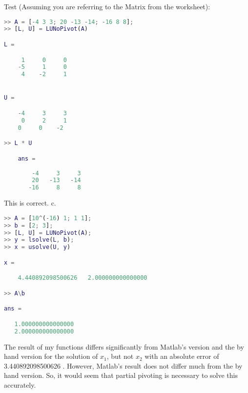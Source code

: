 \documentclass[12pt]{article}
\theoremstyle{homework}
\begin{document}
Test (Assuming you are referring to the Matrix from the worksheet):
\begin{lstlisting}[language=Matlab]
>> A = [-4 3 3; 20 -13 -14; -16 8 8];
>> [L, U] = LUNoPivot(A)

L =

	 1     0     0
	-5     1     0
	 4    -2     1


U =

	-4     3     3
	 0     2     1
    0     0    -2

>> L * U

    ans =
     
        -4     3     3
        20   -13   -14
       -16     8     8
\end{lstlisting}
This is correct. c.
\begin{lstlisting}[language=Matlab]
>> A = [10^(-16) 1; 1 1];
>> b = [2; 3];
>> [L, U] = LUNoPivot(A);
>> y = lsolve(L, b);
>> x = usolve(U, y)

x =

	4.440892098500626   2.000000000000000

>> A\b

ans =

   1.000000000000000
   2.000000000000000
\end{lstlisting}
The result of my functions differs significantly from Matlab's version and the by hand
version for the solution of $x_1$, but not $x_2$ with an absolute error of 3.440892098500626
. However, Matlab's result does not differ much from the by hand version. So, it would seem 
that partial pivoting is necessary to solve this accurately.
\end{document}
